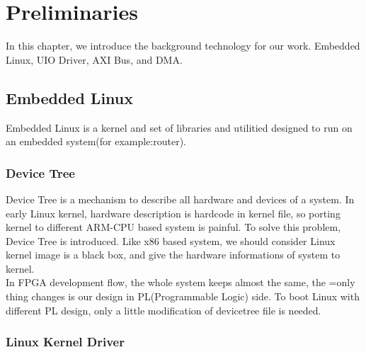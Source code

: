 \chapter{Preliminaries}
\label{cha:Preliminaries}
In this chapter, we introduce the background technology for our work. 
Embedded Linux, UIO Driver, AXI Bus, and DMA.



\section{Embedded Linux}
\label{sec:Embedded Linux}

Embedded Linux is a kernel and set of libraries and utilitied designed to run
on an embedded system(for example:router). 

\subsection{Device Tree}
\label{subsec:Device Tree}

Device Tree is a mechanism to describe all hardware and devices of a system. In early Linux 
kernel, hardware description is hardcode in kernel file, so porting kernel to different
ARM-CPU based system is painful. To solve this problem, Device Tree is introduced. 
Like x86 based system, we should consider Linux kernel image is a black box, and give the 
hardware informations of system to kernel. \\
%
In FPGA development flow, the whole system keeps almost the same, the =only thing changes 
is our design in PL(Programmable Logic) side. To boot Linux with different PL design, only 
a little modification of devicetree file is needed.     


\subsection{Linux Kernel Driver}
\label{subsec:Linux Kernel Driver} 



